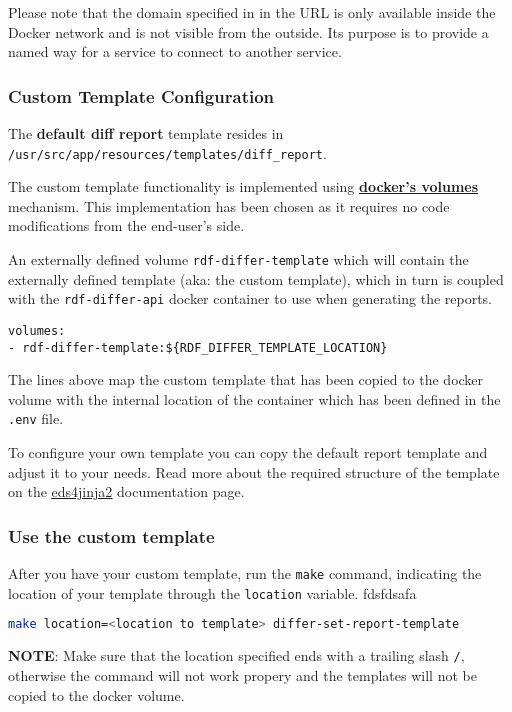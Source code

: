 	Please note that the domain specified in in the URL is only available inside the Docker network and is not visible from the outside. Its purpose is to provide a named way for a service to connect to another service. 

		\subsubsection{Custom Template Configuration}
		The \textbf{default diff report} template resides in \\ \texttt{/usr/src/app/resources/templates/diff\_report}.

		The custom template functionality is implemented using \textbf{\href{https://docs.docker.com/storage/volumes/}{docker's volumes}} mechanism. This implementation has been chosen as it requires no code modifications from the end-user's side.
		
		An externally defined volume \texttt{rdf-differ-template} which will contain the externally defined template (aka: the custom template), which in turn is coupled with the \texttt{rdf-differ-api} docker container to use when generating the reports.
		\begin{lstlisting}[]
volumes:
- rdf-differ-template:${RDF_DIFFER_TEMPLATE_LOCATION}
		\end{lstlisting}
		The lines above map the custom template that has been copied to the docker volume with the internal location of the container which has been defined in the \texttt{.env} file.
		
		To configure your own template you can copy the default report template and adjust it to your needs. Read more about the required structure of the template on the \href{https://eds4jinja2.readthedocs.io/en/latest/#target-directory-layout}{\underline{eds4jinja2}} documentation page.
 
		\subsubsection{Use the custom template}
		After you have your custom template, run the \texttt{make} command, indicating the location of your template through the \texttt{location} variable. fdsfdsafa
		\begin{lstlisting}[language=bash]
make location=<location to template> differ-set-report-template
		\end{lstlisting}

		\textbf{NOTE}: Make sure that the location specified ends with a trailing slash \texttt{/}, otherwise the command will not work propery and the templates will not be copied to the docker volume.

